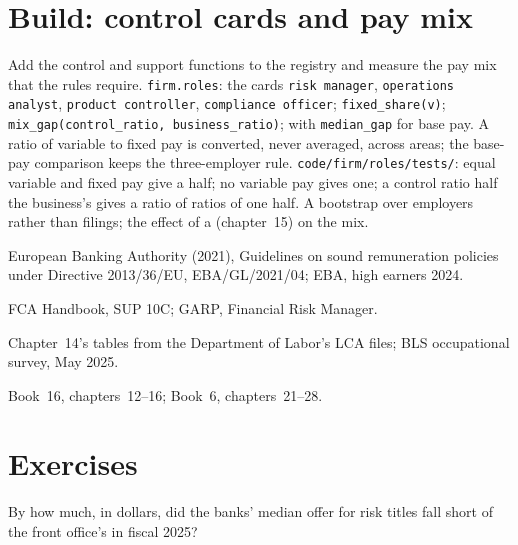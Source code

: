 \section{Build: control cards and pay mix}\label{bld:in:risk-operations-product-control-and-compliance:roles}

\begin{build}
 Add the control and support functions to the registry and measure the pay mix that the rules require.
 \texttt{firm.roles}: the cards \texttt{risk manager}, \texttt{operations analyst}, \texttt{product
controller}, \texttt{compliance officer}; \texttt{fixed\_share(v)}; \texttt{mix\_gap(control\_ratio, business\_ratio)};
with \texttt{median\_gap} for base pay.
 A ratio of variable to fixed pay is converted, never averaged, across areas; the base-pay comparison keeps
the three-employer rule.
 \texttt{code/firm/roles/tests/}: equal variable and fixed pay give a half; no variable pay gives
one; a control ratio half the business's gives a ratio of ratios of one half.
 A bootstrap over employers rather than filings; the effect of a  (chapter~15) on the mix.
\end{build}

\begin{omsources}
\item European Banking Authority (2021), Guidelines on sound remuneration policies under Directive 2013/36/EU,
EBA/GL/2021/04; EBA, high earners 2024.
\item FCA Handbook, SUP 10C; GARP, Financial Risk Manager.
\item Chapter~14's tables from the Department of Labor's LCA files; BLS occupational survey, May 2025.
\item Book~16, chapters~12--16; Book~6, chapters~21--28.
\end{omsources}

\section{Exercises}

\begin{exercise}[$\star$]\label{exo:in:risk-operations-product-control-and-compliance:1}
By how much, in dollars, did the banks' median offer for risk titles fall short of the front office's in fiscal 2025?
\end{exercise}

